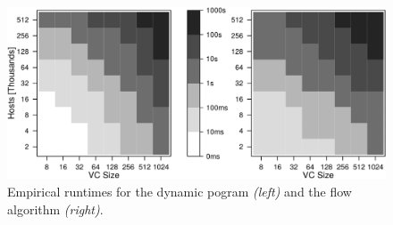 \documentclass[conference,10pt]{IEEEtran}
\newcommand{\CostTrans}{\ensuremath{b_1}}
\newcommand{\CostCom}{\ensuremath{b_2}}
\begin{document}



%

%

\begin{figure}
\includegraphics[width=\columnwidth]{figs/heatmap}
\caption{Empirical runtimes for the dynamic pogram \textit{(left)} and the flow algorithm \textit{(right)}.} 
\label{fig:heatmap}
\end{figure}
\end{document}
